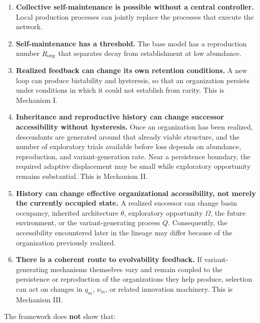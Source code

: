 \documentclass[11pt,a4paper]{article}
\begin{document}
\begin{enumerate}
\def\labelenumi{\arabic{enumi}.}
\item
  \textbf{Collective self-maintenance is possible without a central
  controller.} Local production processes can jointly replace the
  processes that execute the network.
\item
  \textbf{Self-maintenance has a threshold.} The base model has a
  reproduction number \(R_{\rm org}\) that separates decay from
  establishment at low abundance.
\item
  \textbf{Realized feedback can change its own retention conditions.} A
  new loop can produce bistability and hysteresis, so that an
  organization persists under conditions in which it could not establish
  from rarity. This is Mechanism I.
\item
  \textbf{Inheritance and reproductive history can change successor
  accessibility without hysteresis.} Once an organization has been
  realized, descendants are generated around that already viable
  structure, and the number of exploratory trials available before loss
  depends on abundance, reproduction, and variant-generation rate. Near
  a persistence boundary, the required adaptive displacement may be
  small while exploratory opportunity remains substantial. This is
  Mechanism II.
\item
  \textbf{History can change effective organizational accessibility, not
  merely the currently occupied state.} A realized successor can change
  basin occupancy, inherited architecture \(\theta\), exploratory
  opportunity \(\Omega\), the future environment, or the
  variant-generating process \(Q\). Consequently, the accessibility
  encountered later in the lineage may differ because of the
  organization previously realized.
\item
  \textbf{There is a coherent route to evolvability feedback.} If
  variant-generating mechanisms themselves vary and remain coupled to
  the persistence or reproduction of the organizations they help
  produce, selection can act on changes in \(q_m\), \(\nu_m\), or
  related innovation machinery. This is Mechanism III.
\end{enumerate}

The framework does \textbf{not} show that:
\end{document}
